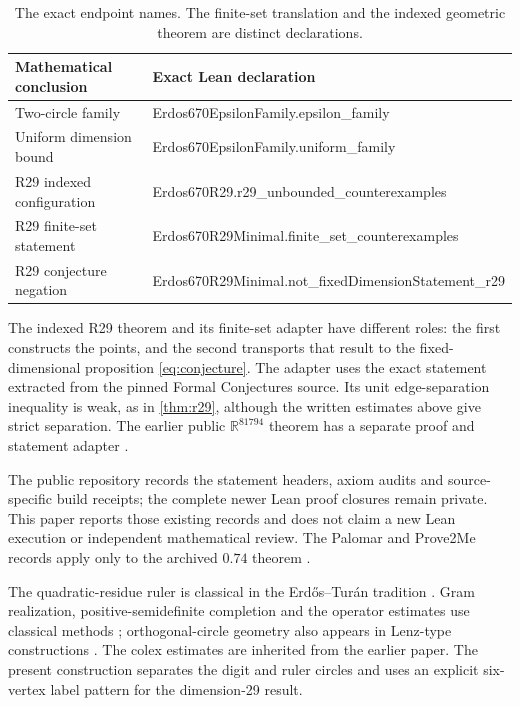 \documentclass[11pt]{article}
\numberwithin{equation}{section}
\theoremstyle{definition}\newtheorem{definition}[theorem]{Definition}
\theoremstyle{remark}\newtheorem{remark}[theorem]{Remark}
\newcommand{\R}{\mathbb R}\newcommand{\N}{\mathbb N}
\newcommand{\code}[1]{{\ttfamily\small #1}}
\begin{document}
\begin{table}[ht]
\centering\footnotesize
\begin{tabularx}{\textwidth}{@{}p{}X@{}}
\toprule
Mathematical conclusion & Exact Lean declaration\\\midrule
Two-circle family & \code{Erdos670EpsilonFamily.epsilon\_family}\\[3pt]
Uniform dimension bound & \code{Erdos670EpsilonFamily.uniform\_family}\\[3pt]
R29 indexed configuration & \code{Erdos670R29.r29\_unbounded\_counterexamples}\\[3pt]
R29 finite-set statement & \code{Erdos670R29Minimal.finite\_set\_counterexamples}\\[3pt]
R29 conjecture negation & \code{Erdos670R29Minimal.not\_fixedDimensionStatement\_r29}\\
\bottomrule
\end{tabularx}
\caption{The exact endpoint names. The finite-set translation and the indexed
geometric theorem are distinct declarations.}
\label{tab:lean}
\end{table}

The indexed R29 theorem and its finite-set adapter have different roles:
the first constructs the points, and the second transports that result to
the fixed-dimensional proposition \eqref{eq:conjecture}. The adapter uses
the exact statement extracted from the pinned Formal Conjectures source.
Its unit edge-separation inequality is weak, as in \cref{thm:r29}, although
the written estimates above give strict separation. The earlier public
$\R^{81794}$ theorem has a separate proof and statement adapter
\cite{PublishedFinite,PublicStatus}.

The public repository records the statement headers, axiom audits and
source-specific build receipts; the complete newer Lean proof closures
remain private. This paper reports those existing records and does not
claim a new Lean execution or independent mathematical review. The
Palomar and Prove2Me records apply only to the archived $0.74$ theorem
\cite{PublicStatus}.

The quadratic-residue ruler is classical in the Erd\H{o}s--Tur\'an
tradition \cite{ErdosTuran}. Gram realization, positive-semidefinite
completion and the operator estimates use classical methods
\cite{Schoenberg,Schur,Sinnamon,Robinson}; orthogonal-circle geometry also
appears in Lenz-type constructions \cite{ErdosLenz}. The colex estimates
are inherited from the earlier paper. The present construction separates
the digit and ruler circles and uses an explicit six-vertex label pattern
for the dimension-29 result.
\end{document}
